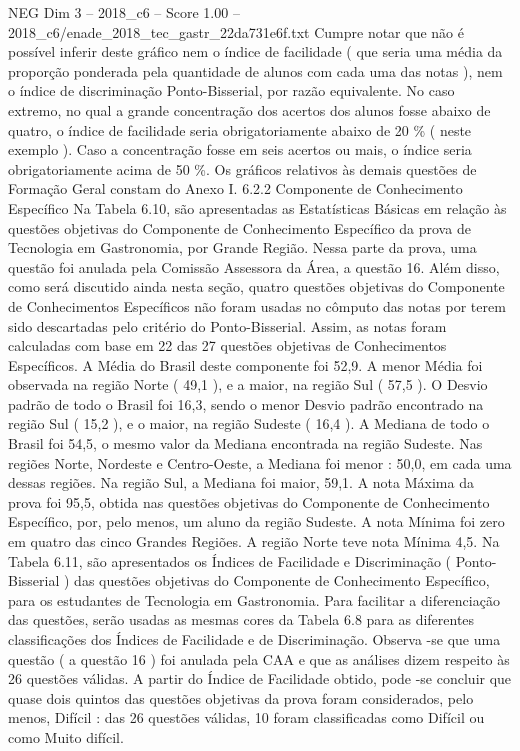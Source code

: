 \begin{textsample}{NEG Dim 3 – 2018\_c6 – Score 1.00 – 2018\_c6/enade\_2018\_tec\_gastr\_22da731e6f.txt}
Cumpre notar que não é possível inferir deste gráfico nem o índice de facilidade ( que seria uma média da proporção ponderada pela quantidade de alunos com cada uma das notas ), nem o índice de discriminação Ponto-Bisserial, por razão equivalente.
No caso extremo, no qual a grande concentração dos acertos dos alunos fosse abaixo de quatro, o índice de facilidade seria obrigatoriamente abaixo de 20 \% ( neste exemplo ).
Caso a concentração fosse em seis acertos ou mais, o índice seria obrigatoriamente acima de 50 \%.
Os gráficos relativos às demais questões de Formação Geral constam do Anexo I. 6.2.2 Componente de Conhecimento Específico Na Tabela 6.10, são apresentadas as Estatísticas Básicas em relação às questões objetivas do Componente de Conhecimento Específico da prova de Tecnologia em Gastronomia, por Grande Região.
Nessa parte da prova, uma questão foi anulada pela Comissão Assessora da Área, a questão 16.
Além disso, como será discutido ainda nesta seção, quatro questões objetivas do Componente de Conhecimentos Específicos não foram usadas no cômputo das notas por terem sido descartadas pelo critério do Ponto-Bisserial.
Assim, as notas foram calculadas com base em 22 das 27 questões objetivas de Conhecimentos Específicos.
A Média do Brasil deste componente foi 52,9.
A menor Média foi observada na região Norte ( 49,1 ), e a maior, na região Sul ( 57,5 ).
O Desvio padrão de todo o Brasil foi 16,3, sendo o menor Desvio padrão encontrado na região Sul ( 15,2 ), e o maior, na região Sudeste ( 16,4 ).
A Mediana de todo o Brasil foi 54,5, o mesmo valor da Mediana encontrada na região Sudeste.
Nas regiões Norte, Nordeste e Centro-Oeste, a Mediana foi menor : 50,0, em cada uma dessas regiões.
Na região Sul, a Mediana foi maior, 59,1.
A nota Máxima da prova foi 95,5, obtida nas questões objetivas do Componente de Conhecimento Específico, por, pelo menos, um aluno da região Sudeste.
A nota Mínima foi zero em quatro das cinco Grandes Regiões.
A região Norte teve nota Mínima 4,5.
Na Tabela 6.11, são apresentados os Índices de Facilidade e Discriminação ( Ponto-Bisserial ) das questões objetivas do Componente de Conhecimento Específico, para os estudantes de Tecnologia em Gastronomia.
Para facilitar a diferenciação das questões, serão usadas as mesmas cores da Tabela 6.8 para as diferentes classificações dos Índices de Facilidade e de Discriminação.
Observa -se que uma questão ( a questão 16 ) foi anulada pela CAA e que as análises dizem respeito às 26 questões válidas.
A partir do Índice de Facilidade obtido, pode -se concluir que quase dois quintos das questões objetivas da prova foram considerados, pelo menos, Difícil : das 26 questões válidas, 10 foram classificadas como Difícil ou como Muito difícil.

\end{textsample}

